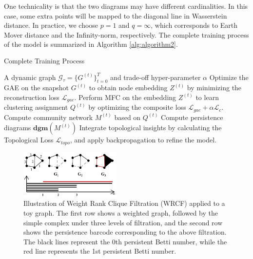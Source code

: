 \documentclass[letterpaper]{article} %
\begin{document}
One technicality is that the two diagrams may have different cardinalities. In this case,  some extra points will be mapped to the diagonal line in Wasserstein distance. In practice, we choose $p=1$ and $q=\infty$, which corresponds to 
Earth Mover distance and the Infinity-norm, respectively. %
The complete training process of the model is summarized in Algorithm \ref{alg:algorithm2}.
\begin{algorithm}
\caption{Complete Training Process}
\label{alg:algorithm2}

\begin{algorithmic}[1]
\REQUIRE A dynamic graph $\mathcal{G}_\tau=\{G^{(t)}\}_{t=0}^T$ and trade-off hyper-parameter $\alpha$
    \STATE Optimize the GAE on the snapshot $G^{(t)}$ to obtain node embedding $Z^{(t)}$ by minimizing the reconstruction loss $\mathcal{L}_{gae}$.
    \STATE Perform MFC on the embedding $Z^{(t)}$ to learn clustering assignment $Q^{(t)}$ by optimizing the composite loss $\mathcal{L}_{gae} + \alpha \mathcal{L}_{c}$.
    \STATE Compute community network $M^{(t)}$ based on $Q^{(t)}$
    \STATE Compute persistence diagrams $\mathbf{dgm}(M^{(t)})$
\ENDFOR
\STATE Integrate topological insights by calculating the Topological Loss $\mathcal{L}_{topo}$, and apply backpropagation to refine the model.
\end{algorithmic} 
\end{algorithm}

\begin{figure}[] %
\centering %
\includegraphics[width=0.45\textwidth]{pic/wrcf.pdf} %
\caption{Illustration of Weight Rank Clique Filtration (WRCF) applied to a toy graph. The first row shows a weighted graph, followed by the simple complex under three levels of filtration, and the second row shows the persistence barcode corresponding to the above filtration. The black lines represent the 0th persistent Betti number, while the red line represents the 1st persistent Betti number.} %
\label{Fig.wrcf} %
\end{figure}
\end{document}
